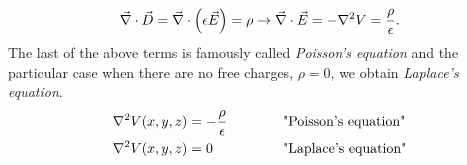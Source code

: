 \documentclass[10pt,a4paper]{report}
\def\Nabla{\ensuremath\vec{\nabla}}
\def\div{\ensuremath\Nabla\cdot}
\def\lap{\ensuremath\nabla^2}
\begin{document}
\begin{equation*}
  \div \vec{D} = \div \left ( \epsilon \vec {E} \right ) = \rho \rightarrow \div \vec{E} = -\lap {V}=\frac{\rho}{\epsilon}.
\end{equation*}
The last of the above terms is famously called \emph{Poisson's equation} and the particular case when there are no free charges, $\rho = 0 $, we obtain \emph{Laplace's equation}.
\begin{alignat}{2}
  \lap V(x,y,z) &= -\frac{\rho}{\epsilon}  &\quad\quad\quad &\text{"Poisson's equation"}  \label{eq:possonequation}\\
  \lap V(x,y,z) &= 0  &\quad\quad\quad &\text{"Laplace's equation"} \label{eq:laplaceequation}
\end{alignat}
\\ 
\end{document}

